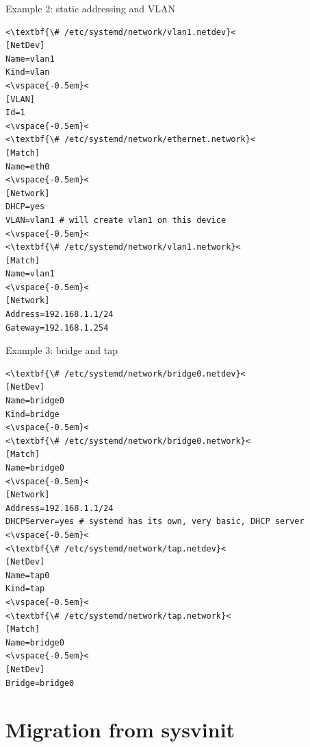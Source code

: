 \documentclass[11pt,final,usepdftitle=false]{beamer}
\begin{document}
\begin{frame}[fragile]{Example 2: static addressing and VLAN}
\begin{lstlisting}[basicstyle=\ttfamily\footnotesize,escapeinside={<<}]
<\textbf{\# /etc/systemd/network/vlan1.netdev}<
[NetDev]
Name=vlan1
Kind=vlan
<\vspace{-0.5em}<
[VLAN]
Id=1
<\vspace{-0.5em}<
<\textbf{\# /etc/systemd/network/ethernet.network}<
[Match]
Name=eth0
<\vspace{-0.5em}<
[Network]
DHCP=yes
VLAN=vlan1 # will create vlan1 on this device
<\vspace{-0.5em}<
<\textbf{\# /etc/systemd/network/vlan1.network}<
[Match]
Name=vlan1
<\vspace{-0.5em}<
[Network]
Address=192.168.1.1/24
Gateway=192.168.1.254
\end{lstlisting}
\end{frame}

\begin{frame}[fragile]{Example 3: bridge and tap}
\begin{lstlisting}[basicstyle=\ttfamily\scriptsize,escapeinside={<<}]
<\textbf{\# /etc/systemd/network/bridge0.netdev}<
[NetDev]
Name=bridge0
Kind=bridge
<\vspace{-0.5em}<
<\textbf{\# /etc/systemd/network/bridge0.network}<
[Match]
Name=bridge0
<\vspace{-0.5em}<
[Network]
Address=192.168.1.1/24
DHCPServer=yes # systemd has its own, very basic, DHCP server
<\vspace{-0.5em}<
<\textbf{\# /etc/systemd/network/tap.netdev}<
[NetDev]
Name=tap0
Kind=tap
<\vspace{-0.5em}<
<\textbf{\# /etc/systemd/network/tap.network}<
[Match]
Name=bridge0
<\vspace{-0.5em}<
[NetDev]
Bridge=bridge0
\end{lstlisting}
\end{frame}

\section{Migration from sysvinit}
\end{document}
